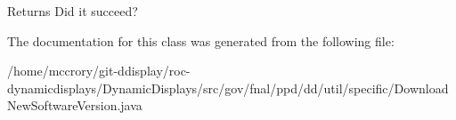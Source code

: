 \begin{DoxyReturn}{Returns}
Did it succeed? 
\end{DoxyReturn}


The documentation for this class was generated from the following file\-:\begin{DoxyCompactItemize}
\item 
/home/mccrory/git-\/ddisplay/roc-\/dynamicdisplays/\-Dynamic\-Displays/src/gov/fnal/ppd/dd/util/specific/Download\-New\-Software\-Version.\-java\end{DoxyCompactItemize}
